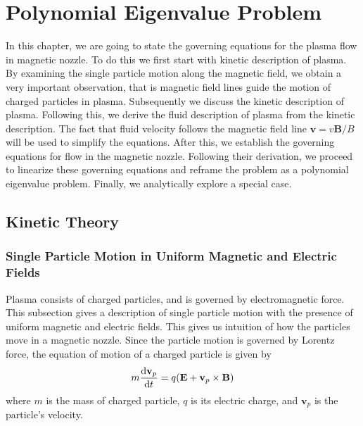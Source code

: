 \chapter{Polynomial Eigenvalue Problem} \label{chap:polynomial-eigenvalue-problem}
In this chapter, we are going to state the governing equations for the plasma flow in magnetic nozzle. To do this we first start with kinetic description of plasma. By examining the single particle motion along the magnetic field, we obtain a very important observation, that is magnetic field lines guide the motion of charged particles in plasma. Subsequently we discuss the kinetic description of plasma. Following this, we derive the fluid description of plasma from the kinetic description. The fact that fluid velocity follows the magnetic field line $\mathbf{v} = v\mathbf{B}/B$ will be used to simplify the equations. After this, we establish the governing equations for flow in the magnetic nozzle. Following their derivation, we proceed to linearize these governing equations and reframe the problem as a polynomial eigenvalue problem. Finally, we analytically explore a special case.

\section{Kinetic Theory}
\subsection{Single Particle Motion in Uniform Magnetic and Electric Fields} \label{sec:single-particle-motion}
Plasma consists of charged particles, and is governed by electromagnetic force. This subsection gives a description of single particle motion with the presence of uniform magnetic and electric fields. This gives us intuition of how the particles move in a magnetic nozzle. Since the particle motion is governed by Lorentz force, the equation of motion of a charged particle is given by
\begin{equation}
	m\dv{\mathbf{v}_p}{t} = q(\mathbf{E} + \mathbf{v}_p\times \mathbf{B})
	\label{eq:equation-of-motion-single-particle}
\end{equation}
where $m$ is the mass of charged particle, $q$ is its electric charge, and $\mathbf{v}_p$ is the particle's velocity.

